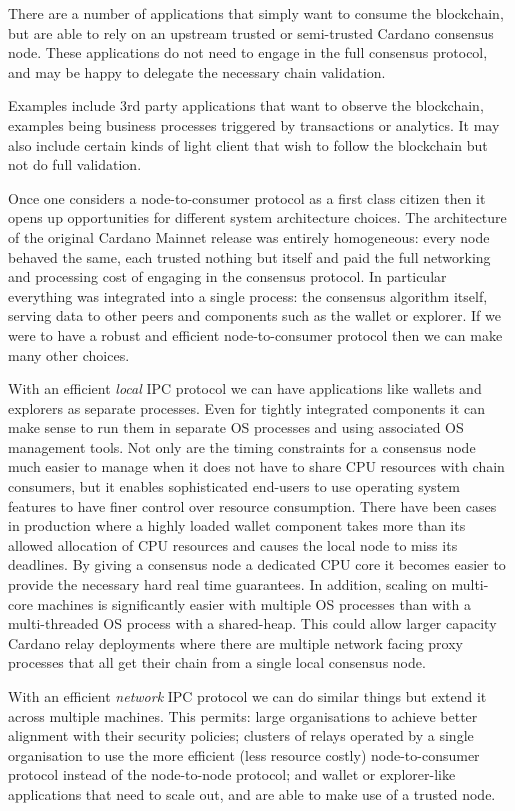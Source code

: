 \documentclass{report}
\theoremstyle{definition}{
  \newtheorem{lemma}{Lemma}[section] %
  \newtheorem{definition}[lemma]{Definition}
}
\theoremstyle{theorem}{
  \newtheorem{invariant}[lemma]{Invariant}
  \newtheorem{proofobligation}[lemma]{Proof Obligation}
}
\numberwithin{equation}{lemma}
\begin{document}
There are a number of applications that simply want to consume the blockchain,
but are able to rely on an upstream trusted or semi-trusted Cardano consensus
node. These applications do not need to engage in the full consensus protocol,
and may be happy to delegate the necessary chain validation.

Examples include 3rd party applications that want to observe the blockchain,
examples being business processes triggered by transactions or analytics.  It
may also include certain kinds of light client that wish to follow the
blockchain but not do full validation.

Once one considers a node-to-consumer protocol as a first class citizen then it
opens up opportunities for different system architecture choices.
The architecture of the original Cardano Mainnet release was entirely homogeneous:
every node behaved the same, each trusted nothing but itself and paid the full
networking and processing cost of engaging in the consensus protocol.  In
particular everything was integrated into a single process: the consensus
algorithm itself, serving data to other peers and components such as the wallet
or explorer. If we were to have a robust and efficient node-to-consumer protocol
then we can make many other choices.

With an efficient \emph{local} IPC protocol we can have applications
like wallets and explorers as separate processes. Even for tightly
integrated components it can make sense to run them in separate OS
processes and using associated OS management tools. Not only are the
timing constraints for a consensus node much easier to manage when
it does not have to share CPU resources with chain consumers,
but it enables sophisticated end-users to use operating system features
to have finer control over resource consumption.
There have been cases in production where a highly loaded wallet component takes
more than its allowed allocation of CPU resources and causes the local
node to miss its deadlines.  By giving a consensus node a dedicated
CPU core it becomes easier to provide the necessary hard real
time guarantees. In addition, scaling on multi-core machines is
significantly easier with multiple OS processes than with a
multi-threaded OS process with a shared-heap. This could allow
larger capacity Cardano relay deployments where there are multiple
network facing proxy processes that all get their chain from a single
local consensus node.

With an efficient \emph{network} IPC protocol we can do similar things
but extend it across multiple machines. This permits: large
organisations to achieve better alignment with their security
policies; clusters of relays operated by a single organisation to use
the more efficient (less resource costly) node-to-consumer protocol
instead of the node-to-node protocol; and wallet
or explorer-like applications that need to scale out, and are able to
make use of a trusted node.
\end{document}
